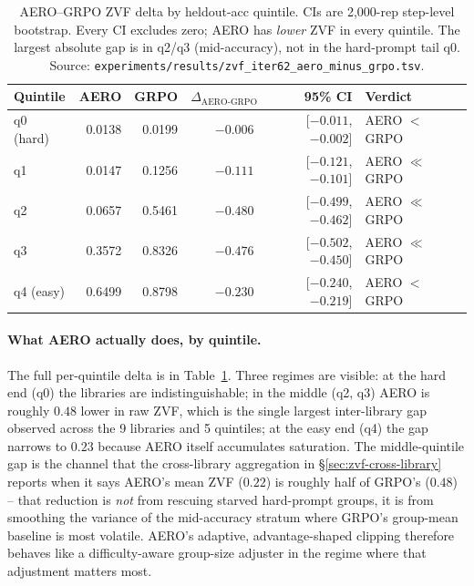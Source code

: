\begin{table}[htbp]
\centering
\small
\setlength{\tabcolsep}{4pt}
\begin{tabular}{lrrrrl}
\hline
Quintile & AERO & GRPO & $\Delta_{\text{AERO-GRPO}}$ & 95\% CI & Verdict \\
\hline
q0 (hard)   & 0.0138 & 0.0199 & $-0.006$ & [$-0.011$, $-0.002$] & AERO $<$ GRPO \\
q1          & 0.0147 & 0.1256 & $-0.111$ & [$-0.121$, $-0.101$] & AERO $\ll$ GRPO \\
q2          & 0.0657 & 0.5461 & $-0.480$ & [$-0.499$, $-0.462$] & AERO $\ll$ GRPO \\
q3          & 0.3572 & 0.8326 & $-0.476$ & [$-0.502$, $-0.450$] & AERO $\ll$ GRPO \\
q4 (easy)   & 0.6499 & 0.8798 & $-0.230$ & [$-0.240$, $-0.219$] & AERO $<$ GRPO \\
\hline
\end{tabular}
\caption{AERO--GRPO ZVF delta by heldout-acc quintile. CIs are
2{,}000-rep step-level bootstrap. Every CI excludes zero; AERO has
\emph{lower} ZVF in every quintile. The largest absolute gap is in
q2/q3 (mid-accuracy), not in the hard-prompt tail q0. Source:
\texttt{experiments/results/zvf\_iter62\_aero\_minus\_grpo.tsv}.}
\label{tab:zvf-aero-delta}
\end{table}

\paragraph{What AERO actually does, by quintile.}
The full per-quintile delta is in Table~\ref{tab:zvf-aero-delta}.
Three regimes are visible: at the hard end (q0) the libraries are
indistinguishable; in the middle (q2, q3) AERO is roughly
$0.48$ lower in raw ZVF, which is the single largest inter-library
gap observed across the 9 libraries and 5 quintiles; at the easy end
(q4) the gap narrows to $0.23$ because AERO itself accumulates
saturation. The middle-quintile gap is the channel that the
cross-library aggregation in \S\ref{sec:zvf-cross-library} reports
when it says AERO's mean ZVF ($0.22$) is roughly half of GRPO's
($0.48$) -- that reduction is \emph{not} from rescuing starved
hard-prompt groups, it is from smoothing the variance of the
mid-accuracy stratum where GRPO's group-mean baseline is most
volatile. AERO's adaptive, advantage-shaped clipping therefore
behaves like a difficulty-aware group-size adjuster in the regime
where that adjustment matters most.

